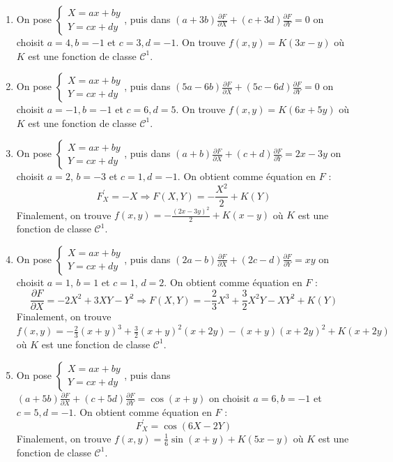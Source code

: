 \documentclass[12pt]{article}
\newcounter{exercice}
\begin{document}
\begin{corrige}[title=Corrigé des exercices précédents]
\begin{enumerate}
  \item On pose $\left\{\begin{array}{l}X = ax + by \\ Y = cx + dy\end{array}\right.$, puis dans $(a+3b) \frac{\partial F}{\partial X} + (c+3d) \frac{\partial F}{\partial Y} = 0$ on choisit $a=4, b=-1$ et $c=3, d=-1$. On trouve $f(x, y) = K(3x-y)$ où $K$ est une fonction de classe $\mathcal{C}^{1}$.
  
  \item On pose $\left\{\begin{array}{l}X = ax + by \\ Y = cx + dy\end{array}\right.$, puis dans $(5a-6b) \frac{\partial F}{\partial X} + (5c-6d) \frac{\partial F}{\partial Y} = 0$ on choisit $a=-1, b=-1$ et $c=6, d=5$. On trouve $f(x, y) = K(6x+5y)$ où $K$ est une fonction de classe $\mathcal{C}^{1}$.
  
  \item On pose $\left\{\begin{array}{l}X = ax + by \\ Y = cx + dy\end{array}\right.$, puis dans $(a+b) \frac{\partial F}{\partial X} + (c+d) \frac{\partial F}{\partial Y} = 2x-3y$ on choisit $a=2$, $b=-3$ et $c=1, d=-1$. On obtient comme équation en $F$ :
$$
F_{X}^{\prime} = -X \Longrightarrow F(X, Y) = -\frac{X^{2}}{2} + K(Y)
$$
Finalement, on trouve $f(x, y) = -\frac{(2x-3y)^{2}}{2} + K(x-y)$ où $K$ est une fonction de classe $\mathcal{C}^{1}$.

  \item On pose $\left\{\begin{array}{l}X = ax + by \\ Y = cx + dy\end{array}\right.$, puis dans $(2a-b) \frac{\partial F}{\partial X} + (2c-d) \frac{\partial F}{\partial Y} = xy$ on choisit $a=1$, $b=1$ et $c=1$, $d=2$. On obtient comme équation en $F$ :
$$
\frac{\partial F}{\partial X} = -2 X^{2} + 3 XY - Y^{2} \Longrightarrow F(X, Y) = -\frac{2}{3} X^{3} + \frac{3}{2} X^{2} Y - XY^{2} + K(Y)
$$
Finalement, on trouve $f(x, y) = -\frac{2}{3}(x+y)^{3} + \frac{3}{2}(x+y)^{2}(x+2y) -(x+y)(x+2y)^{2} + K(x+2y)$ où $K$ est une fonction de classe $\mathcal{C}^{1}$.

  \item On pose $\left\{\begin{array}{l}X = ax + by \\ Y = cx + dy\end{array}\right.$, puis dans $(a+5b) \frac{\partial F}{\partial X} + (c+5d) \frac{\partial F}{\partial Y} = \cos(x+y)$ on choisit $a=6, b=-1$ et $c=5, d=-1$. On obtient comme équation en $F$ :
$$
F_{X}^{\prime} = \cos(6X - 2Y)
$$
Finalement, on trouve $f(x, y) = \frac{1}{6} \sin(x+y) + K(5x-y)$ où $K$ est une fonction de classe $\mathcal{C}^{1}$.


\end{enumerate}
\end{corrige}
\end{document}
